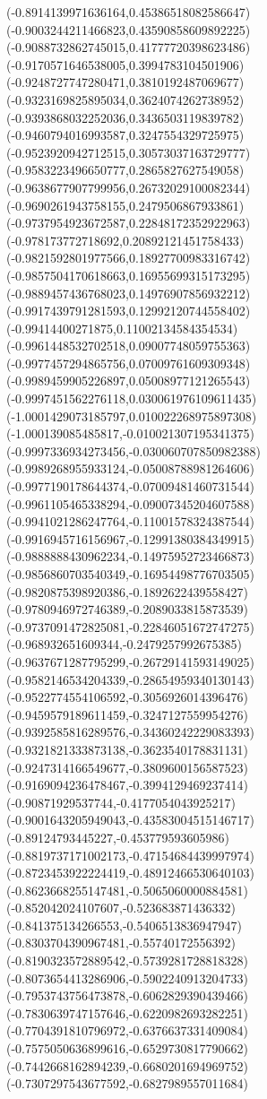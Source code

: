 {(-0.8914139971636164,0.45386518082586647)
(-0.9003244211466823,0.43590858609892225)
(-0.9088732862745015,0.41777720398623486)
(-0.9170571646538005,0.3994783104501906)
(-0.9248727747280471,0.3810192487069677)
(-0.9323169825895034,0.3624074262738952)
(-0.9393868032252036,0.3436503119839782)
(-0.9460794016993587,0.3247554329725975)
(-0.9523920942712515,0.30573037163729777)
(-0.9583223496650777,0.2865827627549058)
(-0.9638677907799956,0.26732029100082344)
(-0.9690261943758155,0.2479506867933861)
(-0.9737954923672587,0.22848172352922963)
(-0.978173772718692,0.20892121451758433)
(-0.9821592801977566,0.18927700983316742)
(-0.9857504170618663,0.16955699315173295)
(-0.9889457436768023,0.14976907856932212)
(-0.9917439791281593,0.12992120744558402)
(-0.99414400271875,0.11002134584354534)
(-0.9961448532702518,0.09007748059755363)
(-0.9977457294865756,0.07009761609309348)
(-0.9989459905226897,0.05008977121265543)
(-0.9997451562276118,0.030061976109611435)
(-1.0001429073185797,0.010022268975897308)
(-1.000139085485817,-0.010021307195341375)
(-0.9997336934273456,-0.030060707850982388)
(-0.9989268955933124,-0.05008788981264606)
(-0.9977190178644374,-0.07009481460731544)
(-0.9961105465338294,-0.09007345204607588)
(-0.9941021286247764,-0.11001578324387544)
(-0.9916945716156967,-0.12991380384349915)
(-0.9888888430962234,-0.14975952723466873)
(-0.9856860703540349,-0.16954498776703505)
(-0.9820875398920386,-0.1892622439558427)
(-0.9780946972746389,-0.2089033815873539)
(-0.9737091472825081,-0.22846051672747275)
(-0.968932651609344,-0.2479257992675385)
(-0.9637671287795299,-0.26729141593149025)
(-0.9582146534204339,-0.28654959340130143)
(-0.9522774554106592,-0.3056926014396476)
(-0.9459579189611459,-0.3247127559954276)
(-0.9392585816289576,-0.34360242229083393)
(-0.9321821333873138,-0.3623540178831131)
(-0.9247314166549677,-0.3809600156587523)
(-0.9169094236478467,-0.3994129469237414)
(-0.90871929537744,-0.4177054043925217)
(-0.9001643205949043,-0.43583004515146717)
(-0.89124793445227,-0.453779593605986)
(-0.8819737171002173,-0.47154684439997974)
(-0.8723453922224419,-0.48912466530640103)
(-0.8623668255147481,-0.5065060000884581)
(-0.852042024107607,-0.523683871436332)
(-0.841375134266553,-0.5406513836947947)
(-0.8303704390967481,-0.55740172556392)
(-0.8190323572889542,-0.5739281728818328)
(-0.8073654413286906,-0.5902240913204733)
(-0.7953743756473878,-0.6062829390439466)
(-0.7830639747157646,-0.6220982693282251)
(-0.7704391810796972,-0.6376637331409084)
(-0.7575050636899616,-0.6529730817790662)
(-0.7442668162894239,-0.6680201694969752)
(-0.7307297543677592,-0.6827989557011684)
}
